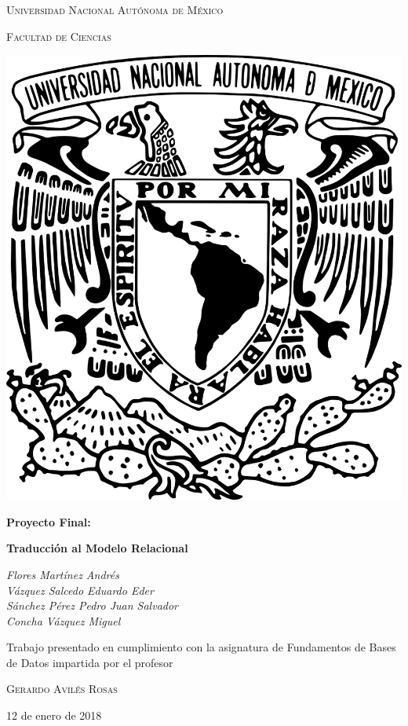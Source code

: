 \documentclass[11pt,letterpaper]{article}
\begin{document}
\begin{titlepage}
	\centering
	{\scshape\LARGE Universidad Nacional Autónoma de México \par}
	\vspace{1cm}
	{\scshape\Large Facultad de Ciencias\par}
	\vspace{1.5cm}
\begin{center}
		\includegraphics[scale=.5]{logo.png}
	\end{center}
		\vspace{.8 cm}

	{\huge\bfseries Proyecto Final: \par}
	{\huge\bfseries Traducción al Modelo Relacional \par}
		\vspace{0.5cm}

	{\Large\itshape Flores Martínez Andrés\\
	Vázquez Salcedo Eduardo Eder\\
	Sánchez Pérez Pedro Juan Salvador\\
	Concha Vázquez Miguel\par}
	\vfill
			\vspace{0.5cm}

	Trabajo presentado en cumplimiento con la asignatura de Fundamentos de Bases de Datos impartida por el profesor	\par
	 \textsc{Gerardo Avilés Rosas}\\
	\vspace{0.1cm}
	{\large 12 de enero de 2018\par}
\end{titlepage}
\end{document}

